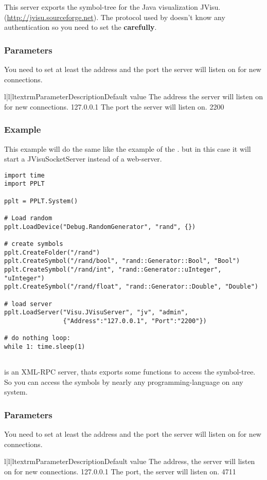 This server exports the symbol-tree for the Java visualization JVisu. 
(\url{http://jvisu.sourceforge.net}). The protocol used by  
doesn't know any authentication so you need to set the 
\textbf{carefully}.

\subsubsection{Parameters}
You need to set at least the address and the port the server will listen on 
for new connections.

\begin{tableiii}{l|l|l}{textrm}{Parameter}{Description}{Default value}
        {The address the server will listen on for new connections.}
        {127.0.0.1}
        {The port the server will listen on.}
        {2200}
\end{tableiii}        

\subsubsection{Example}
This example will do the same like the example of the 
. but in this case it will start a 
JVisuSocketServer instead of a web-server.
\begin{verbatim}
import time
import PPLT

pplt = PPLT.System()

# Load random
pplt.LoadDevice("Debug.RandomGenerator", "rand", {})

# create symbols
pplt.CreateFolder("/rand")
pplt.CreateSymbol("/rand/bool", "rand::Generator::Bool", "Bool")
pplt.CreateSymbol("/rand/int", "rand::Generator::uInteger", "uInteger")
pplt.CreateSymbol("/rand/float", "rand::Generator::Double", "Double")

# load server
pplt.LoadServer("Visu.JVisuServer", "jv", "admin", 
                {"Address":"127.0.0.1", "Port":"2200"})

# do nothing loop:
while 1: time.sleep(1)
    
\end{verbatim}


 is an XML-RPC server, thats exports some functions 
to access the symbol-tree. So you can access the symbols by nearly any 
programming-language on any system. 

\subsubsection{Parameters}
You need to set at least the address and the port the server will listen on 
for new connections. 
\begin{tableiii}{l|l|l}{textrm}{Parameter}{Description}{Default value}
        {The address, the server will listen on for new connections.}
        {127.0.0.1}
        {The port, the server will listen on.}
        {4711}
\end{tableiii}        


